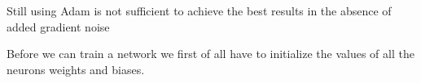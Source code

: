 \documentclass[
a4paper, 
12pt,
grayscalebody, %
abstract=on,
twoside, BCOR10mm, 12pt, DIV13,headinclude, footexclude, final, abstracton, openright
]{ibireprt}
\numberwithin{equation}{chapter}
\numberwithin{table}{chapter}
\numberwithin{figure}{chapter}
\numberwithin{algorithm}{chapter}
\numberwithin{example}{chapter}
\numberwithin{example}{chapter}
\begin{document}
Still using Adam is not sufficient to achieve the best results in the absence of added gradient noise \cite{Neelakantan2015}%



Before we can train a network we first of all have to initialize the values of all the neurons weights and biases.  


\end{document}
